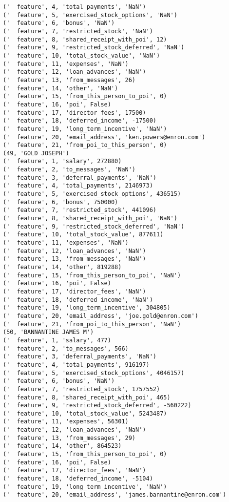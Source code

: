 \begin{verbatim}
('  feature', 4, 'total_payments', 'NaN')
('  feature', 5, 'exercised_stock_options', 'NaN')
('  feature', 6, 'bonus', 'NaN')
('  feature', 7, 'restricted_stock', 'NaN')
('  feature', 8, 'shared_receipt_with_poi', 12)
('  feature', 9, 'restricted_stock_deferred', 'NaN')
('  feature', 10, 'total_stock_value', 'NaN')
('  feature', 11, 'expenses', 'NaN')
('  feature', 12, 'loan_advances', 'NaN')
('  feature', 13, 'from_messages', 26)
('  feature', 14, 'other', 'NaN')
('  feature', 15, 'from_this_person_to_poi', 0)
('  feature', 16, 'poi', False)
('  feature', 17, 'director_fees', 17500)
('  feature', 18, 'deferred_income', -17500)
('  feature', 19, 'long_term_incentive', 'NaN')
('  feature', 20, 'email_address', 'ken.powers@enron.com')
('  feature', 21, 'from_poi_to_this_person', 0)
(49, 'GOLD JOSEPH')
('  feature', 1, 'salary', 272880)
('  feature', 2, 'to_messages', 'NaN')
('  feature', 3, 'deferral_payments', 'NaN')
('  feature', 4, 'total_payments', 2146973)
('  feature', 5, 'exercised_stock_options', 436515)
('  feature', 6, 'bonus', 750000)
('  feature', 7, 'restricted_stock', 441096)
('  feature', 8, 'shared_receipt_with_poi', 'NaN')
('  feature', 9, 'restricted_stock_deferred', 'NaN')
('  feature', 10, 'total_stock_value', 877611)
('  feature', 11, 'expenses', 'NaN')
('  feature', 12, 'loan_advances', 'NaN')
('  feature', 13, 'from_messages', 'NaN')
('  feature', 14, 'other', 819288)
('  feature', 15, 'from_this_person_to_poi', 'NaN')
('  feature', 16, 'poi', False)
('  feature', 17, 'director_fees', 'NaN')
('  feature', 18, 'deferred_income', 'NaN')
('  feature', 19, 'long_term_incentive', 304805)
('  feature', 20, 'email_address', 'joe.gold@enron.com')
('  feature', 21, 'from_poi_to_this_person', 'NaN')
(50, 'BANNANTINE JAMES M')
('  feature', 1, 'salary', 477)
('  feature', 2, 'to_messages', 566)
('  feature', 3, 'deferral_payments', 'NaN')
('  feature', 4, 'total_payments', 916197)
('  feature', 5, 'exercised_stock_options', 4046157)
('  feature', 6, 'bonus', 'NaN')
('  feature', 7, 'restricted_stock', 1757552)
('  feature', 8, 'shared_receipt_with_poi', 465)
('  feature', 9, 'restricted_stock_deferred', -560222)
('  feature', 10, 'total_stock_value', 5243487)
('  feature', 11, 'expenses', 56301)
('  feature', 12, 'loan_advances', 'NaN')
('  feature', 13, 'from_messages', 29)
('  feature', 14, 'other', 864523)
('  feature', 15, 'from_this_person_to_poi', 0)
('  feature', 16, 'poi', False)
('  feature', 17, 'director_fees', 'NaN')
('  feature', 18, 'deferred_income', -5104)
('  feature', 19, 'long_term_incentive', 'NaN')
('  feature', 20, 'email_address', 'james.bannantine@enron.com')

\end{verbatim}
